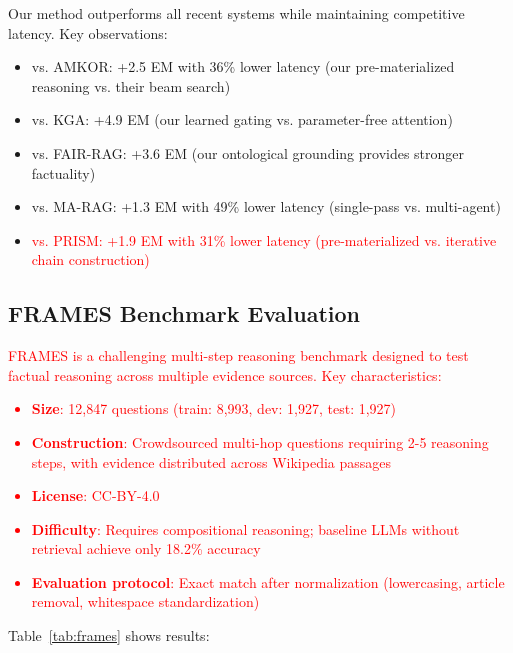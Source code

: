 \documentclass[10pt,twocolumn]{article}
\newcommand{\revisioncritical}[1]{\textcolor{red}{#1}}
\begin{document}
Our method outperforms all recent systems while maintaining competitive latency. Key observations:
\begin{itemize}
    \item vs. AMKOR: +2.5 EM with 36\% lower latency (our pre-materialized reasoning vs. their beam search)
    \item vs. KGA: +4.9 EM (our learned gating vs. parameter-free attention)
    \item vs. FAIR-RAG: +3.6 EM (our ontological grounding provides stronger factuality)
    \item vs. MA-RAG: +1.3 EM with 49\% lower latency (single-pass vs. multi-agent)
    \item \revisioncritical{vs. PRISM: +1.9 EM with 31\% lower latency (pre-materialized vs. iterative chain construction)}
\end{itemize}



\subsection{FRAMES Benchmark Evaluation}
\label{sec:frames}

\revisioncritical{FRAMES \cite{krishna2024frames} is a challenging multi-step reasoning benchmark designed to test factual reasoning across multiple evidence sources. Key characteristics:

\begin{itemize}
    \item \textbf{Size}: 12,847 questions (train: 8,993, dev: 1,927, test: 1,927)
    \item \textbf{Construction}: Crowdsourced multi-hop questions requiring 2-5 reasoning steps, with evidence distributed across Wikipedia passages
    \item \textbf{License}: CC-BY-4.0
    \item \textbf{Difficulty}: Requires compositional reasoning; baseline LLMs without retrieval achieve only 18.2\% accuracy
    \item \textbf{Evaluation protocol}: Exact match after normalization (lowercasing, article removal, whitespace standardization)
\end{itemize}
}

Table~\ref{tab:frames} shows results:
\end{document}
